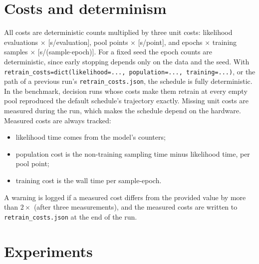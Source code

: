 \documentclass[11pt,a4paper]{article}
\newcommand{\code}[1]{\texttt{#1}}
\begin{document}
\section{Costs and determinism}

All costs are deterministic counts multiplied by three unit costs:
likelihood evaluations $\times$ [s/evaluation], pool points $\times$
[s/point], and epochs $\times$ training samples $\times$ [s/(sample$\cdot$epoch)].
For a fixed seed the epoch counts are deterministic, since early stopping
depends only on the data and the seed. With
\code{retrain\_costs=dict(likelihood=..., population=..., training=...)}, or
the path of a previous run's \code{retrain\_costs.json}, the schedule is
fully deterministic. In the benchmark, decision runs whose costs make them
retrain at every empty pool reproduced the default schedule's trajectory
exactly. Missing unit costs are measured during the run, which makes the
schedule depend on the hardware. Measured costs are always tracked:
\begin{itemize}
  \item likelihood time comes from the model's counters;
  \item population cost is the non-training sampling time minus likelihood
        time, per pool point;
  \item training cost is the wall time per sample-epoch.
\end{itemize}
A warning is logged if a measured cost differs from the provided value by
more than $2\times$ (after three measurements), and the measured costs are
written to \code{retrain\_costs.json} at the end of the run.

\section{Experiments}
\end{document}
